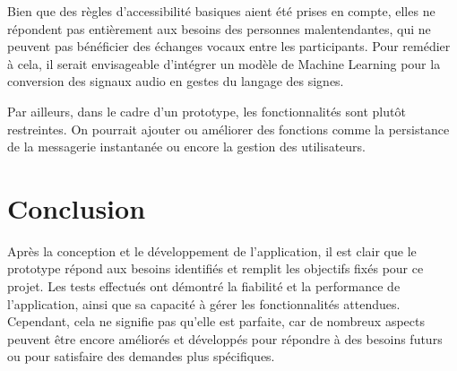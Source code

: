 Bien que des règles d'accessibilité basiques aient été prises en compte, elles ne répondent pas entièrement aux 
besoins des personnes malentendantes, qui ne peuvent pas bénéficier des échanges vocaux entre les participants. 
Pour remédier à cela, il serait envisageable d'intégrer un modèle de Machine Learning pour la conversion des signaux 
audio en gestes du langage des signes.

Par ailleurs, dans le cadre d’un prototype, les fonctionnalités sont plutôt restreintes. 
On pourrait ajouter ou améliorer des fonctions comme la persistance de la messagerie instantanée ou 
encore la gestion des utilisateurs.

\section*{Conclusion}
Après la conception et le développement de l'application, il est clair que le prototype répond aux besoins identifiés et remplit les objectifs fixés pour ce projet. 
Les tests effectués ont démontré la fiabilité et la performance de l'application, ainsi que sa capacité à gérer les fonctionnalités attendues. 
Cependant, cela ne signifie pas qu'elle est parfaite, car de nombreux aspects peuvent être encore améliorés et développés pour répondre à des besoins futurs ou pour satisfaire des demandes plus spécifiques. 